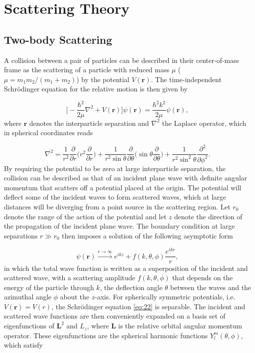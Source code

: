\chapter{Scattering Theory}
\section{Two-body Scattering} \label{Two-body scattering}
A collision between a pair of particles can be described in their center-of-mass frame as the scattering of a particle with reduced mass $\mu$ ($\mu = m_1m_2/(m_1 + m_2)$) by the potential $V(\mathbf{r})$. The time-independent  Schr{\"o}dinger equation for the relative motion is then given by 

\begin{equation} \label{eq:22}
\bigg[-\frac{\hbar^2}{2\mu}\nabla^2 + V(\mathbf{r})\bigg]\psi(\mathbf{r}) = \frac{\hbar^2 k^2}{2 \mu}\psi(\mathbf{r}),
\end{equation}
where $\mathbf{r}$ denotes the interparticle separation and $\nabla^2$ the Laplace operator, which in spherical coordinates reads

\begin{equation} \label{eq:23}
\nabla^2 = \frac{1}{r^2} \frac{\partial}{\partial r} \bigg(r^2 \frac{\partial}{\partial r}\bigg) + \frac{1}{r^2 \sin\theta} \frac{\partial}{\partial\theta} \bigg(\sin\theta \frac{\partial}{\partial\theta}\bigg) + \frac{1}{r^2 \sin^2\theta} \frac{\partial^2}{\partial\phi^2}.
\end{equation}
By requiring the potential to be zero at large interparticle separation, the collision can be described as that of an incident plane wave with definite angular momentum that scatters off a potential placed at the origin. The potential will deflect some of the incident waves to form scattered waves, which at large distances will be diverging from a point source in the scattering region. Let $r_0$ denote the range of the action of the potential and let $z$ denote the direction of the propagation of the incident plane wave. The boundary condition at large separations $r \gg r_0$ then imposes a solution of the following asymptotic form

\begin{equation}\label{eq:26}
\psi(\mathbf{r}) \xrightarrow{r \to \infty} e^{ikz} + f(k,\theta,\phi)\frac{e^{ikr}}{r},
\end{equation}
in which the total wave function is written as a superposition of the incident and scattered wave, with a scattering amplitude $f(k,\theta,\phi)$ that depends on the energy of the particle through $k$, the deflection angle $\theta$ between the waves and the azimuthal angle $\phi$ about the $z$-axis. For spherically symmetric potentials, i.e. $V(\mathbf{r}) = V(r)$, the Schr{\"o}dinger equation \eqref{eq:22} is separable. The incident and scattered wave functions are then conveniently expanded on a basis set of eigenfunctions of $\mathbf{L}^2$ and $L_z$, where $\mathbf{L}$ is the relative orbital angular momentum operator. These eigenfunctions are the spherical harmonic functions $Y_l^m(\theta,\phi)$, which satisfy 

